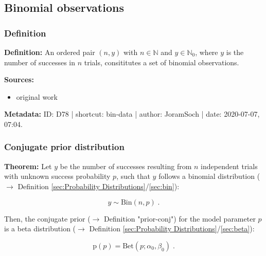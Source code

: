 \documentclass[a4paper,12pt,twoside]{book}
\begin{document}
\subsection{Binomial observations}

\subsubsection[\textit{Definition}]{Definition} \label{sec:bin-data}
\setcounter{equation}{0}

\textbf{Definition:} An ordered pair $(n,y)$ with $n \in \mathbb{N}$ and $y \in \mathbb{N}_0$, where $y$ is the number of successes in $n$ trials, consititutes a set of binomial observations.


\vspace{1em}
\textbf{Sources:}
\begin{itemize}
\item original work\end{itemize}


\vspace{1em}
\textbf{Metadata:} ID: D78 | shortcut: bin-data | author: JoramSoch | date: 2020-07-07, 07:04.
\vspace{1em}



\subsubsection[\textbf{Conjugate prior distribution}]{Conjugate prior distribution} \label{sec:bin-prior}
\setcounter{equation}{0}

\textbf{Theorem:} Let $y$ be the number of successes resulting from $n$ independent trials with unknown success probability $p$, such that $y$ follows a binomial distribution ($\rightarrow$ Definition \ref{sec:Probability Distributions}/\ref{sec:bin}):

\begin{equation} \label{eq:bin-prior-Bin}
y \sim \mathrm{Bin}(n,p) \; .
\end{equation}

Then, the conjugate prior ($\rightarrow$ Definition "prior-conj") for the model parameter $p$ is a beta distribution ($\rightarrow$ Definition \ref{sec:Probability Distributions}/\ref{sec:beta}):

\begin{equation} \label{eq:bin-prior-Beta}
\mathrm{p}(p) = \mathrm{Bet}(p; \alpha_0, \beta_0) \; .
\end{equation}
\end{document}
